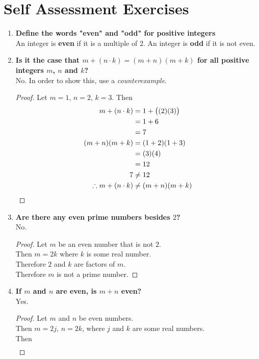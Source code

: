 \documentclass[../notes.tex]{subfiles}
\begin{document}
		\section{Self Assessment Exercises}
			\begin{enumerate}
				\item \textbf{Define the words "even" and "odd" for positive integers}\\
					An integer is \textbf{even} if it is a multiple of $2$. An integer is \textbf{odd} if it is not even.
				\item \textbf{Is it the case that $m + (n\cdot k) = (m + n)(m + k)$ for all positive integers $m$, $n$ and $k$?}\\
					No. In order to show this, use a \textit{counterexample}.
					\begin{proof}
						Let $m = 1$, $n = 2$, $k = 3$. Then
						\begin{align*}
							m + (n \cdot k) &= 1 + \bigl((2)(3)\bigr)\\
							&= 1 + 6\\
							&= 7\\
							(m + n)(m + k) &= (1 + 2)(1 + 3)\\
							&= (3)(4)\\
							&= 12\\
							7 &\neq 12\\
							\therefore m + (n \cdot k) &\neq (m + n)(m + k) \qedhere
						\end{align*}
					\end{proof}
				\item \textbf{Are there any even prime numbers besides $2$?}\\
				No.
				\begin{proof}
					Let $m$ be an even number that is not $2$.\\
					Then $m = 2k$ where $k$ is some real number.\\
					Therefore $2$ and $k$ are factors of $m$.\\
					Therefore $m$ is not a prime number.
				\end{proof}
				\item \textbf{If $m$ and $n$ are even, is $m + n$ even?}\\
				Yes.
				\begin{proof}
					Let $m$ and $n$ be even numbers.\\
					Then $m = 2j$, $n = 2k$, where $j$ and $k$ are some real numbers.\\
					Then
					\begin{align*}

\end{align*}
\end{proof}
\end{enumerate}
\end{document}
